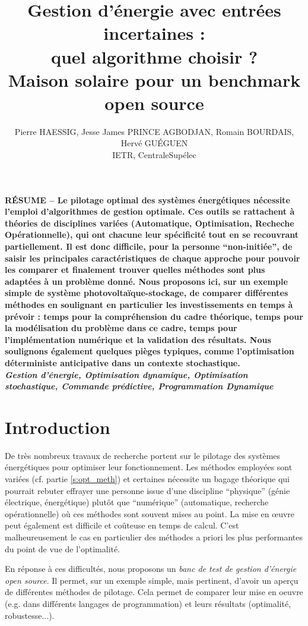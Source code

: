 \documentclass[a4paper,10pt,twocolumn]{article}
\title{
\fontsize{24pt}{24pt}\selectfont
Gestion d'énergie avec entrées incertaines : \\
quel algorithme choisir ?\\
Maison solaire pour un benchmark open source
}
\author{
\fontsize{11pt}{11pt}\selectfont
Pierre HAESSIG\tsp{*}, Jesse James PRINCE AGBODJAN\tsp{*}, Romain BOURDAIS\tsp{*}, Hervé GUÉGUEN\tsp{*}\\
\fontsize{10pt}{10pt}\selectfont
\tsp{*}IETR, CentraleSupélec
}
\date{}
\begin{document}
\maketitle
\thispagestyle{fancy}


\fontsize{9pt}{9pt}\selectfont
\textbf{RÉSUME --
Le pilotage optimal des systèmes énergétiques nécessite l'emploi d'algorithmes
de gestion optimale.
Ces outils se rattachent à théories de disciplines variées (Automatique, Optimisation, Recheche Opérationnelle),
qui ont chacune leur spécificité tout en se recouvrant partiellement.
%
Il est donc difficile, pour la personne ``non-initiée'', de saisir les principales caractéristiques
de chaque approche pour pouvoir les comparer et finalement trouver
quelles méthodes sont plus adaptées à un problème donné.
%
Nous proposons ici, sur un exemple simple de système photovoltaïque-stockage, de
comparer différentes méthodes en soulignant en particulier les investissements
en temps à prévoir :
temps pour la compréhension du cadre théorique,
temps pour la modélisation du problème dans ce cadre,
temps pour l'implémentation numérique et la validation des résultats.
Nous soulignons également quelques pièges typiques, comme l'optimisation
déterministe anticipative dans un contexte stochastique.
}\\

\textbf{\textit{Gestion d'énergie, Optimisation dynamique, Optimisation stochastique,
Commande prédictive, Programmation Dynamique}}

\fontsize{10pt}{10pt}\selectfont


\section{Introduction}

De très nombreux travaux de recherche portent sur le pilotage des systèmes énergétiques
pour optimiser leur fonctionnement.
Les méthodes employées sont variées (cf. partie \ref{s:opt_meth})
et certaines nécessite un bagage théorique qui pourrait rebuter effrayer
une personne issue d'une discipline ``physique'' (génie électrique, énergétique)
plutôt que ``numérique'' (automatique, recherche opérationnelle) où ces méthodes
sont souvent mises au point.
La mise en œuvre peut également est difficile et coûteuse en temps de calcul.
C'est malheureusement le cas en particulier des méthodes
a priori les plus performantes du point de vue de l'optimalité.

En réponse à ces difficultés, nous proposons un \emph{banc de test de gestion d'énergie open source}.
Il permet, sur un exemple simple, mais pertinent, d'avoir un aperçu de différentes méthodes
de pilotage. Cela permet de comparer leur mise en oeuvre (e.g. dans différents langages de programmation)
et leurs résultats (optimalité, robustesse...).
\end{document}
